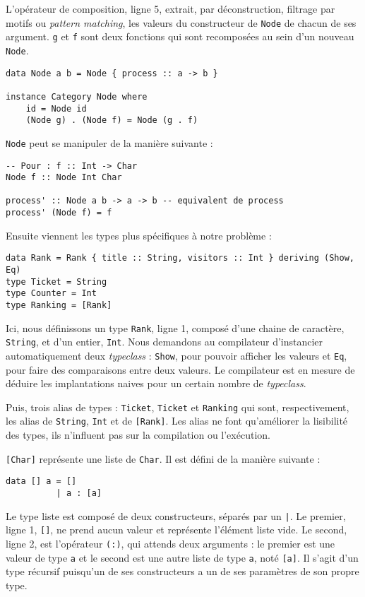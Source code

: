 \documentclass{llncs}
\begin{document}
L'opérateur de composition, ligne 5, extrait, par déconstruction, filtrage par motifs
ou \emph{pattern matching}, les valeurs du constructeur de \lstinline{Node} de chacun de ses argument.
\lstinline{g} et \lstinline{f} sont deux fonctions qui sont recomposées au sein
d'un nouveau \lstinline{Node}.

\begin{lstlisting}
data Node a b = Node { process :: a -> b }

instance Category Node where
    id = Node id
    (Node g) . (Node f) = Node (g . f)
\end{lstlisting}

\lstinline{Node} peut se manipuler de la manière suivante :
\begin{lstlisting}
-- Pour : f :: Int -> Char
Node f :: Node Int Char

process' :: Node a b -> a -> b -- equivalent de process
process' (Node f) = f
\end{lstlisting}

Ensuite viennent les types plus spécifiques à notre problème :

\begin{lstlisting}
data Rank = Rank { title :: String, visitors :: Int } deriving (Show, Eq)
type Ticket = String
type Counter = Int
type Ranking = [Rank]
\end{lstlisting}

Ici, nous définissons un type \lstinline{Rank}, ligne 1,
composé d'une chaine de caractère, \lstinline{String}, et d'un entier, \lstinline{Int}.
Nous demandons au compilateur d'instancier automatiquement deux \emph{typeclass} :
\lstinline{Show}, pour pouvoir afficher les valeurs et \lstinline{Eq},
pour faire des comparaisons entre deux valeurs.
Le compilateur est en mesure de déduire les implantations naives pour un certain
nombre de \emph{typeclass}.

Puis, trois alias de types : \lstinline{Ticket}, \lstinline{Ticket} et
\lstinline{Ranking} qui sont, respectivement, les alias de \lstinline{String},
\lstinline{Int} et de \lstinline{[Rank]}.
Les alias ne font qu'améliorer la lisibilité des types, ils n'influent pas sur
la compilation ou l'exécution.

\lstinline{[Char]} représente une liste de \lstinline{Char}.
Il est défini de la manière suivante :
\begin{lstlisting}
data [] a = []
          | a : [a]
\end{lstlisting}

Le type liste est composé de deux constructeurs, séparés par un \lstinline{|}.
Le premier, ligne 1, \lstinline{[]}, ne prend aucun valeur et représente l'élément
liste vide.
Le second, ligne 2, est l'opérateur \lstinline{(:)}, qui attends deux arguments :
le premier est une valeur de type \lstinline{a} et le second est une autre liste de
type \lstinline{a}, noté \lstinline{[a]}.
Il s'agit d'un type récursif puisqu'un de ses constructeurs a un de ses paramètres
de son propre type.
\end{document}

